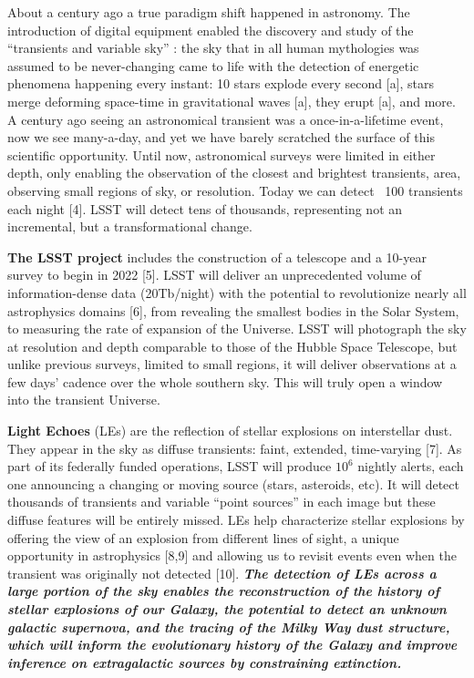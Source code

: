 \documentclass{proposalnsf}
\begin{document}
About a century ago a true paradigm shift happened in astronomy.   The introduction of digital equipment enabled the discovery and study of the “transients and variable sky” : the sky that in all human mythologies was assumed to be never-changing came to life with the detection of energetic phenomena happening every instant: 10 stars explode every second [a], stars merge deforming space-time in gravitational waves [a], they erupt [a], and more.   A century ago seeing an astronomical transient was a once-in-a-lifetime event, now we see many-a-day, and yet we have barely scratched the surface of this scientific opportunity.  Until now, astronomical surveys were limited in either depth, only enabling the observation of the closest and brightest transients, area, observing small regions of sky, or resolution.   Today we can detect ~100 transients each night [4].   LSST will detect tens of thousands, representing not an incremental, but a transformational change.  

{\bf The LSST project} includes the construction of a telescope and a 10-year survey to begin in 2022 [5].  LSST will deliver an unprecedented volume of information-dense data (20Tb/night) with the potential to revolutionize nearly all astrophysics domains [6], from revealing the smallest bodies in the Solar System, to measuring the rate of expansion of the Universe.   LSST will photograph the sky at resolution and depth comparable to those of the Hubble Space Telescope, but unlike previous surveys, limited to small regions, it will deliver observations at a few days’ cadence over the whole southern sky.   This will truly open a window into the transient Universe.  

{\bf Light Echoes} (LEs) are the reflection of stellar explosions on interstellar dust.  They appear in the sky as diffuse transients: faint, extended, time-varying [7].  
As part of its federally funded operations, LSST will produce $10^6$ nightly alerts, each one announcing a changing or moving source (stars, asteroids, etc).   It will detect thousands of transients and variable “point sources” in each image but these diffuse features will be entirely missed.   LEs help characterize stellar explosions by offering the view of an explosion from different lines of sight, a unique opportunity in astrophysics [8,9] 
 and allowing us to revisit events even when the transient was originally not detected [10].  
{\bf\emph{ The detection of LEs across a large portion of the sky enables the reconstruction of the history of stellar explosions of our Galaxy, the potential to detect an unknown galactic supernova, and the tracing of the Milky Way dust structure, which will inform the evolutionary history of the Galaxy and improve inference on extragalactic sources by constraining extinction.  }}
\end{document}
